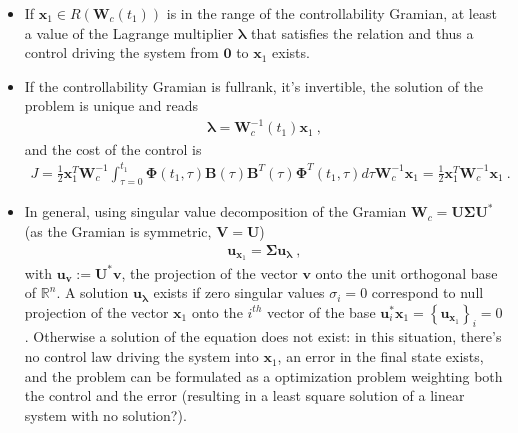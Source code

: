\documentclass[letterpaper,10pt,english]{jupyterBook}
\begin{document}
\begin{itemize}
\item {} 
\sphinxAtStartPar
If \(\mathbf{x}_1 \in R(\mathbf{W}_c(t_1))\) is in the range of the controllability Gramian, at least a value of the Lagrange multiplier \(\boldsymbol\lambda\) that satisfies the relation \sphinxhyphen{} and thus a control driving the system from \(\mathbf{0}\) to \(\mathbf{x}_1\) \sphinxhyphen{} exists.

\item {} 
\sphinxAtStartPar
If the controllability Gramian is full\sphinxhyphen{}rank, it’s invertible, the solution of the problem is unique and reads
\begin{equation*}
\begin{split}\boldsymbol\lambda = \mathbf{W}_c^{-1}(t_1) \mathbf{x}_1 \ ,\end{split}
\end{equation*}
\sphinxAtStartPar
and the cost of the control is
\begin{equation*}
\begin{split}J = \frac{1}{2} \mathbf{x}_1^T \mathbf{W}_c^{-1} \int_{\tau=0}^{t_1} \boldsymbol\Phi(t_1,\tau) \mathbf{B}(\tau) \mathbf{B}^T(\tau)\boldsymbol\Phi^T(t_1,\tau) d \tau \mathbf{W}_c^{-1} \mathbf{x}_1 = \frac{1}{2} \mathbf{x}_1^T \mathbf{W}_c^{-1} \mathbf{x}_1 \ .\end{split}
\end{equation*}
\item {} 
\sphinxAtStartPar
In general, using singular value decomposition of the Gramian \(\mathbf{W}_c = \mathbf{U} \boldsymbol\Sigma \mathbf{U}^*\) (as the Gramian is symmetric, \(\mathbf{V} = \mathbf{U}\))
\begin{equation*}
\begin{split}\mathbf{u}_{\mathbf{x}_1} = \boldsymbol\Sigma \mathbf{u}_{\boldsymbol\lambda} \ ,\end{split}
\end{equation*}
\sphinxAtStartPar
with \(\mathbf{u}_{\mathbf{v}} := \mathbf{U}^* \mathbf{v}\), the projection of the vector \(\mathbf{v}\) onto the unit orthogonal base of \(\mathbb{R}^n\). A solution \(\mathbf{u}_{\boldsymbol\lambda}\) exists if zero singular values \(\sigma_i = 0\) correspond to null projection of the vector \(\mathbf{x}_1\) onto the \(i^{th}\) vector of the base \(\mathbf{u}_i^* \mathbf{x}_1 = \left\{ \mathbf{u}_{\mathbf{x}_1} \right\}_i = 0\). Otherwise a solution of the equation does not exist: in this situation, there’s no control law driving the system into \(\mathbf{x}_1\), an error in the final state exists, and the problem can be formulated as a optimization problem weighting both the control and the error (resulting in a least square solution of a linear system with no solution?).

\end{itemize}
\end{document}
